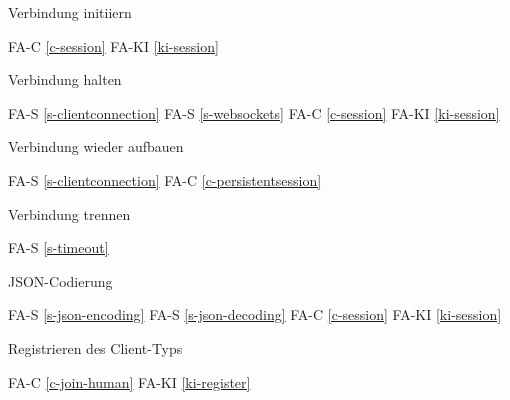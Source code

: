 Verbindung initiiern

FA-C \ref{c-session} %
FA-KI \ref{ki-session} %

Verbindung halten

FA-S \ref{s-clientconnection} %
FA-S \ref{s-websockets} %
FA-C \ref{c-session} %
FA-KI \ref{ki-session} %

Verbindung wieder aufbauen

FA-S \ref{s-clientconnection} %
FA-C \ref{c-persistentsession} %

Verbindung trennen

FA-S \ref{s-timeout} %

JSON-Codierung

FA-S \ref{s-json-encoding} %
FA-S \ref{s-json-decoding} %
FA-C \ref{c-session} %
FA-KI \ref{ki-session} %

Registrieren des Client-Typs

FA-C \ref{c-join-human} %
FA-KI \ref{ki-register} %
